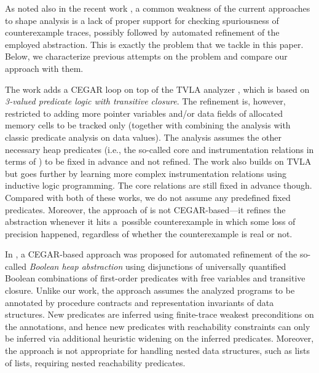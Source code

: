 {As noted also in the recent work \cite{splinter15}, a common weakness of the
current approaches to shape analysis is a lack of proper support for checking
spuriousness of counterexample traces, possibly followed by automated refinement
of the employed abstraction. This is exactly the problem that we tackle in this
paper. Below, we characterize previous attempts on the problem and compare our
approach with them. 

The work \cite{beyer:lazy_shape_analysis} adds a CEGAR loop on top of the TVLA
analyzer \cite{pale}, which is based on \emph{3-valued predicate logic with
transitive closure}. The refinement is, however, restricted to adding more
pointer variables and/or data fields of allocated memory cells to be tracked
only (together with combining the ana\-ly\-sis with classic predicate analysis on
data values). The analysis assumes the other necessary heap predicates (i.e.,
the so-called core and instrumentation relations in terms of \cite{pale}) to
be fixed in advance and not refined. The work
\cite{Loginov:AbstrRefViaInductLearning:05} also builds on TVLA but goes
further by learning more complex instrumentation relations using
inductive logic programming. The core relations are still fixed in
advance though. Compared with both of these works, we do not assume any predefined
fixed predicates. Moreover, the approach of
\cite{Loginov:AbstrRefViaInductLearning:05} is not CEGAR-based---it refines the
abstraction whenever it hits a~possible counterexample in which
some loss of precision happened, regardless of whether the counterexample is
real or not.

In \cite{podelski:popl10}, a CEGAR-based approach was proposed for automated
refinement of the so-called \emph{Boolean heap abstraction} using disjunctions
of universally quantified Boolean combinations of first-order predicates with
free variables and transitive closure.
%
%
Unlike our work, the approach assumes the analyzed programs to be annotated by
procedure contracts and representation invariants of data structures. New
predicates are inferred using finite-trace weakest preconditions on the
annotations, and hence new predicates with reachability constraints can only be
inferred via additional heuristic widening on the inferred predicates. Moreover,
the approach is not appropriate for handling nested data structures, such as
lists of lists, requiring nested reachability predicates.

}
